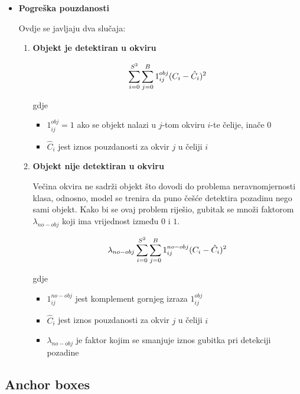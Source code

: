\begin{itemize}
	\item{\textbf{Pogreška pouzdanosti}}

	Ovdje se javljaju dva slučaja:
	\begin{enumerate}
		\item \textbf{Objekt je detektiran u okviru}
		
		\begin{equation}
			\centering
			\sum_{i=0}^{S^2}\sum_{j=0}^{B} 1_{ij}^{obj} (C_i - \hat{C}_i)^2
			\label{eq:confidence-loss-1}
		\end{equation}
		
		gdje 
		\begin{itemize}
			\item $1_{ij}^{obj} = 1$ ako se objekt nalazi u $j$-tom okviru $i$-te čelije, inače $0$
			\item $\hat{C}_i$ jest iznos pouzdanosti za okvir $j$ u čeliji $i$
		\end{itemize}
		
		\item \textbf{Objekt nije detektiran u okviru}
		
		Večina okvira ne sadrži objekt što dovodi do problema neravnomjernosti klasa, odnosno, model se trenira da puno češće detektira pozadinu nego sami objekt. Kako bi se ovaj problem riješio, gubitak se množi faktorom $\lambda_{no-obj}$ koji ima vrijednost između $0$ i $1$.
		
		\begin{equation}
			\centering
			\lambda_{no-obj}\sum_{i=0}^{S^2}\sum_{j=0}^{B} 1_{ij}^{no-obj} (C_i - \hat{C}_i)^2
			\label{eq:confidence-loss-2}
		\end{equation}
		
		gdje 
		\begin{itemize}
			\item $1_{ij}^{no-obj}$ jest komplement gornjeg izraza $1_{ij}^{obj}$
			\item $\hat{C}_i$ jest iznos pouzdanosti za okvir $j$ u čeliji $i$
			\item $\lambda_{no-obj}$ je faktor kojim se smanjuje iznos gubitka pri detekciji pozadine
		\end{itemize}
		
	\end{enumerate}	
		
\end{itemize}

\subsection{Anchor boxes}
\label{anchor-boxes-section}

